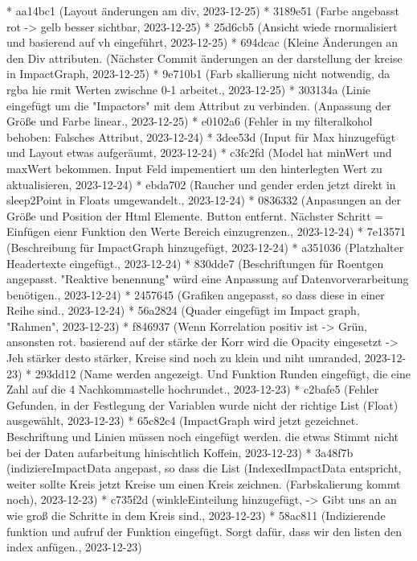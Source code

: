 \documentclass[usegeometry=true]{scrartcl}
\begin{document}
* aa14bc1 (Layout änderungen am div, 2023-12-25)
* 3189e51 (Farbe angebasst rot -> gelb besser sichtbar, 2023-12-25)
* 25d6cb5 (Ansicht wiede rnormalisiert und basierend auf vh eingeführt, 2023-12-25)
* 694dcac (Kleine Änderungen an den Div attributen. (Nächster Commit änderungen an der darstellung der kreise in ImpactGraph, 2023-12-25)
* 9e710b1 (Farb skallierung nicht notwendig, da rgba hie rmit Werten zwischne 0-1 arbeitet., 2023-12-25)
* 303134a (Linie eingefügt um die "Impactors" mit dem Attribut zu verbinden. (Anpassung der Größe und Farbe linear., 2023-12-25)
* e0102a6 (Fehler in my filteralkohol behoben: Falsches Attribut, 2023-12-24)
* 3dee53d (Input für Max hinzugefügt und Layout  etwas aufgeräumt, 2023-12-24)
* c3fc2fd (Model hat minWert und maxWert bekommen. Input Feld impementiert um den hinterlegten Wert zu aktualisieren, 2023-12-24)
* ebda702 (Raucher und gender erden jetzt direkt in sleep2Point in Floats umgewandelt., 2023-12-24)
* 0836332 (Anpasungen an der Größe und Position der Html Elemente. Button entfernt. Nächster Schritt = Einfügen eienr Funktion den Werte Bereich einzugrenzen., 2023-12-24)
* 7e13571 (Beschreibung für ImpactGraph hinzugefügt, 2023-12-24)
* a351036 (Platzhalter Headertexte eingefügt., 2023-12-24)
* 830dde7 (Beschriftungen für Roentgen angepasst. "Reaktive benennung" würd eine Anpassung auf Datenvorverarbeitung benötigen., 2023-12-24)
* 2457645 (Grafiken angepasst, so dass diese in einer Reihe sind., 2023-12-24)
* 56a2824 (Quader eingefügt im Impact graph, "Rahmen", 2023-12-23)
* f846937 (Wenn Korrelation positiv ist -> Grün, ansonsten rot. basierend auf der stärke der Korr wird die Opacity eingesetzt -> Jeh stärker desto stärker, Kreise sind noch zu klein und niht umranded, 2023-12-23)
* 293dd12 (Name werden angezeigt. Und Funktion Runden eingefügt, die eine Zahl auf die 4 Nachkommastelle hochrundet., 2023-12-23)
* c2bafe5 (Fehler Gefunden, in der Festlegung der Variablen wurde nicht der richtige List (Float) ausgewählt, 2023-12-23)
* 65c82c4 (ImpactGraph wird jetzt gezeichnet. Beschriftung und Linien müssen noch eingefügt werden. die etwas Stimmt nicht bei der Daten aufarbeitung  hinischtlich Koffein, 2023-12-23)
* 3a48f7b (indiziereImpactData angepast, so dass die List (IndexedImpactData entspricht, weiter sollte Kreis jetzt Kreise um einen Kreis zeichnen. (Farbskalierung kommt noch), 2023-12-23)
* c735f2d (winkleEinteilung hinzugefügt, -> Gibt uns an an wie groß die Schritte in dem Kreis sind., 2023-12-23)
* 58ac811 (Indizierende funktion und aufruf der Funktion eingefügt. Sorgt dafür, dass wir den listen den index anfügen., 2023-12-23)
\end{document}
